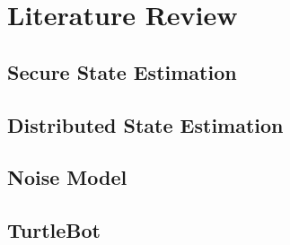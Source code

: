 \documentclass[thesis.tex]{subfile}
\begin{document}
\chapter{Literature Review} \label{Literature Review}
\section{Secure State Estimation}
\section{Distributed State Estimation}
\section{Noise Model}
\section{TurtleBot}
\end{document}
